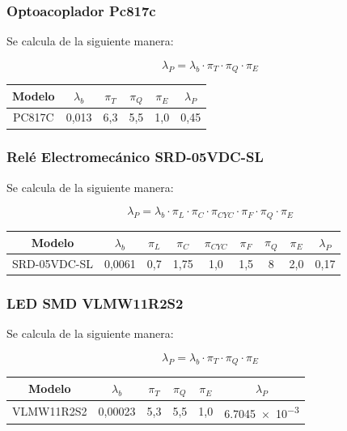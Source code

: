 \documentclass{article}
\begin{document}
\subsubsection{Optoacoplador Pc817c }
Se calcula de la siguiente manera:

\[\lambda_P = \lambda_b  \cdot \pi_T  \cdot \pi_Q  \cdot \pi_E \] 
\begin{center}
\begin{tabular}{ | c | c | c | c | c | c |}
  \hline
  Modelo & $\lambda_b$ & $\pi_T$ & $\pi_Q$ & $\pi_E$ & $\lambda_P$ \\
  \hline
    PC817C & 0,013 & 6,3 & 5,5 & 1,0 &  0,45 \\
  \hline
\end{tabular}
\end{center}

\subsubsection{Relé Electromecánico SRD-05VDC-SL}
Se calcula de la siguiente manera:

\[\lambda_P = \lambda_b  \cdot \pi_L  \cdot \pi_C  \cdot \pi_{CYC}  \cdot \pi_F  \cdot \pi_Q  \cdot \pi_E \] 

\begin{center}
\begin{tabular}{ | c | c | c | c | c | c | c | c | c |}
  \hline
  Modelo & $\lambda_b$ & $\pi_L$ & $\pi_C$ & $\pi_{CYC}$ & $\pi_F$ & $\pi_Q$ & $\pi_E$ & $\lambda_P$ \\
  \hline
    SRD-05VDC-SL & 0,0061 & 0,7 & 1,75 & 1,0 & 1,5 & 8 & 2,0 & 0,17 \\
  \hline
\end{tabular}
\end{center}

\subsubsection{LED SMD VLMW11R2S2}
Se calcula de la siguiente manera:

\[\lambda_P = \lambda_b  \cdot \pi_T  \cdot \pi_Q  \cdot \pi_E \] 
\begin{center}
\begin{tabular}{ | c | c | c | c | c | c |}
  \hline
  Modelo & $\lambda_b$ & $\pi_T$ & $\pi_Q$ & $\pi_E$ & $\lambda_P$ \\
  \hline
    VLMW11R2S2 & 0,00023 & 5,3 & 5,5 & 1,0 & \num{6,7045e-3} \\
  \hline
\end{tabular}
\end{center}
\end{document}
